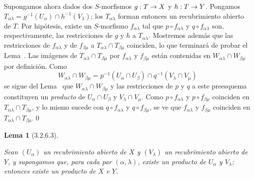 \documentclass[oneside]{amsart}
\theoremstyle{ega-env-style}
\theoremstyle{ega-thm-env-style}
\newtheorem*{lemma}{Lema}
\theoremstyle{ega-defn-env-style}
\renewcommand{\to}{\mathchoice{\longrightarrow}{\rightarrow}{\rightarrow}{\rightarrow}}
\newcommand{\oldpage}[2][]{{\marginnote{\normalfont{\textbf{#1}~|~#2}}}\ignorespaces}
\let\EGAOriginalLabel\label
\renewcommand{\label}[1]{\phantomsection\EGAOriginalLabel{#1}}
\begin{document}
Supongamos ahora dados dos $S$-morfismos $g:T\to X$ y $h:T\to Y$. Pongamos
$T_{\alpha\lambda}=g^{-1}(U_\alpha)\cap h^{-1}(V_\lambda)$; los $T_{\alpha\lambda}$ forman entonces un
recubrimiento abierto de $T$. Por hipótesis, existe un $S$-morfismo $f_{\alpha\lambda}$ tal que
$p\circ f_{\alpha\lambda}$ y $q\circ f_{\alpha\lambda}$ son, respectivamente, las restricciones de
$g$ y $h$ a $T_{\alpha\lambda}$. Mostremos además que las restricciones de
$f_{\alpha\lambda}$ y de $f_{\beta\mu}$ a $T_{\alpha\lambda}\cap T_{\beta\mu}$ coinciden,
lo que terminará de probar el Lema~. Las imágenes de
$T_{\alpha\lambda}\cap T_{\beta\mu}$ por $f_{\alpha\lambda}$ y $f_{\beta\mu}$ están
contenidas en $W_{\alpha\lambda}\cap W_{\beta\mu}$ por definición. Como
\[
  W_{\alpha\lambda}\cap W_{\beta\mu}
  =p^{-1}(U_\alpha\cap U_\beta)\cap
   q^{-1}(V_\lambda\cap V_\mu)
\]
se sigue del Lema~ que $W_{\alpha\lambda}\cap W_{\beta\mu}$ y las
restricciones de $p$ y $q$ a este preesquema constituyen un \emph{producto} de $U_\alpha\cap U_\beta$
y $V_\lambda\cap V_\mu$. Como $p\circ f_{\alpha\lambda}$ y $p\circ f_{\beta\mu}$ coinciden
en $T_{\alpha\lambda}\cap T_{\beta\mu}$, y lo mismo sucede con $q\circ f_{\alpha\lambda}$ y
$q\circ f_{\beta\mu}$, se ve que $f_{\alpha\lambda}$ y $f_{\beta\mu}$ coinciden en
$T_{\alpha\lambda}\cap T_{\beta\mu}$.\qed


\oldpage[I]{107}
\begin{lemma}[3.2.6.3]
\label{I.3.2.6.3}

Sean $(U_\alpha)$ un recubrimiento abierto de $X$ y $(V_\lambda)$ un recubrimiento abierto de $Y$, y supongamos
que, para cada par $(\alpha,\lambda)$, existe un producto de $U_\alpha$ y $V_\lambda$;
entonces existe un producto de $X$ e $Y$.
\end{lemma}
\end{document}
